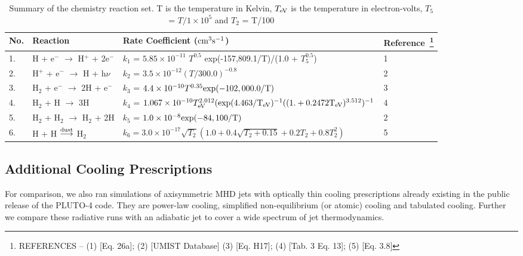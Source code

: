 \documentclass[useAMS,usenatbib,letters]{mn2e}
\begin{document}
\begin{table*}
\begin{minipage}{\textwidth}
\caption{Summary of the chemistry reaction set. T is the temperature
  in Kelvin, $T_{\rm eV}$ is the temperature in electron-volts, $T_{5}$
  = $T/1\times10^{5}$  and 
$T_{2}$  = T/100}
\label{tab:chemeq}
\begin{tabular}{l l l l}
\hline
No. & Reaction & Rate Coefficient ($\rm {cm}^{3} s^{-1}$) &
Reference~\footnote{REFERENCES -- (1) \cite{Cen:1992p13616} [Eq. 26a];
  (2) \cite{Woodall:2007p13623} [UMIST Database] (3)
  \cite{Galli:1998p13066} [Eq. H17]; (4) \cite{Abel:1997p12836}
  [Tab. 3 Eq. 13]; (5) \cite{Hollenbach:1979p12707} [Eq. 3.8]}\\
\hline
1. & H + e$^{-}$ $\rightarrow$ H$^{+}$ + 2e$^{-}$ & $k_1$ = $5.85
\times 10^{-11}$ $T^{0.5}$ \rm{exp}(-157,809.1/T)/(1.0 + $T_{5}^{0.5}$) & 1\\
2. & H$^{+}$ + e$^{-}$ $\rightarrow$ H + h$\nu$ & $k_2$ =
$3.5\times10^{-12} (T/300.0)^{-0.8}$ & 2\\
3. & H$_{2}$ + e$^{-}$ $\rightarrow$ 2H + e$^{-}$ & $k_3$ =
$4.4\times10^{-10} T^{0.35} \rm{exp}(-102,000.0/T)$ & 3\\
4. & H$_{2}$ + H $\rightarrow$ 3H & $k_4$ = $1.067\times10^{-10}
T_{\rm eV}^{2.012}(\rm{exp}(4.463/T_{\rm eV})^{-1}((1. + 0.2472 T_{\rm eV})^{3.512})^{-1} $& 4\\
5. &H$_{2}$ + H$_{2}$ $\rightarrow$ H$_{2}$ + 2H & $k_5$ = $1.0\times 10^{-8} \rm{exp}(-84,100/T)$ & 2\\
6. & H + H $\overset{\rm dust}\longrightarrow$ H$_{2}$ & $k_6 =
3.0\times10^{-17}\sqrt{T_{2}}(1.0 + 0.4\sqrt{T_{2} + 0.15} + 0.2T_{2} + 0.8T_{2}^{2})$ & 5 \\
\hline
\end{tabular}
\end{minipage}
\end{table*}

\subsection{Additional Cooling Prescriptions}
For comparison, we also ran simulations of axisymmetric MHD jets
with optically thin cooling prescriptions already existing in the public
release of the PLUTO-4 code. They are power-law cooling, 
simplified non-equilibrium (or atomic) cooling and tabulated
cooling. Further we compare these radiative runs with an adiabatic jet 
to cover a wide spectrum of jet thermodynamics. 
%
\end{document}
